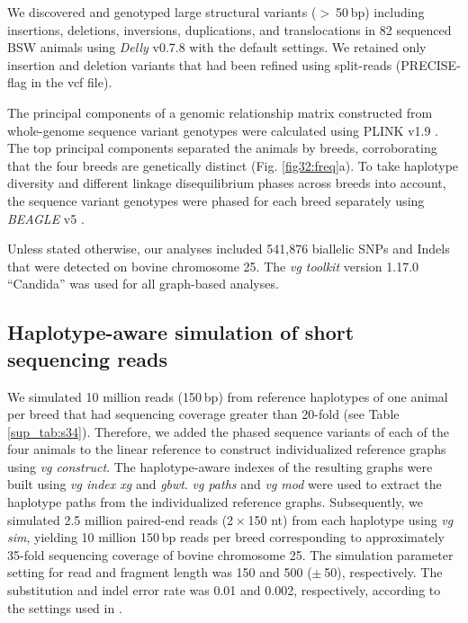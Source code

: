\documentclass[../main.tex]{subfiles}
\begin{document}
We discovered and genotyped large structural variants ($>$ 50 bp) including insertions, deletions, inversions, duplications, and translocations in 82 sequenced BSW animals using \emph{Delly} v0.7.8 \citep{rausch2012delly} with the default settings. We retained only insertion and deletion variants that had been refined using split-reads (PRECISE-flag in the vcf file).

The principal components of a genomic relationship matrix constructed from whole-genome sequence variant genotypes were calculated using PLINK v1.9 \citep{chang2015second}. The top principal components separated the animals by breeds, corroborating that the four breeds are genetically distinct (Fig. \ref{fig32:freq}a). To take haplotype diversity and different linkage disequilibrium phases across breeds into account, the sequence variant genotypes were phased for each breed separately using \emph{BEAGLE} v5 \citep{browning2018one}.

Unless stated otherwise, our analyses included 541,876 biallelic SNPs and Indels that were detected on bovine chromosome 25. The \emph{vg toolkit} version 1.17.0 “Candida” \citep{garrison2018variation} was used for all graph-based analyses.

\subsection*{Haplotype-aware simulation of short sequencing reads}


We simulated 10 million reads (150 bp) from reference haplotypes of one animal per breed that had sequencing coverage greater than 20-fold (see Table \ref{sup_tab:s34}). Therefore, we added the phased sequence variants of each of the four animals to the linear reference to construct individualized reference graphs using \emph{vg construct}. The haplotype-aware indexes of the resulting graphs were built using \emph{vg index xg} and \emph{gbwt}. \emph{vg paths} and \emph{vg mod} were used to extract the haplotype paths from the individualized reference graphs. Subsequently, we simulated 2.5 million paired-end reads (2 × 150 nt) from each haplotype using \emph{vg sim}, yielding 10 million 150 bp reads per breed corresponding to approximately 35-fold sequencing coverage of bovine chromosome 25. The simulation parameter setting for read and fragment length was 150 and 500 ($\pm$ 50), respectively. The substitution and indel error rate was 0.01 and 0.002, respectively, according to the settings used in \citep{garrison2018variation}.
\end{document}
